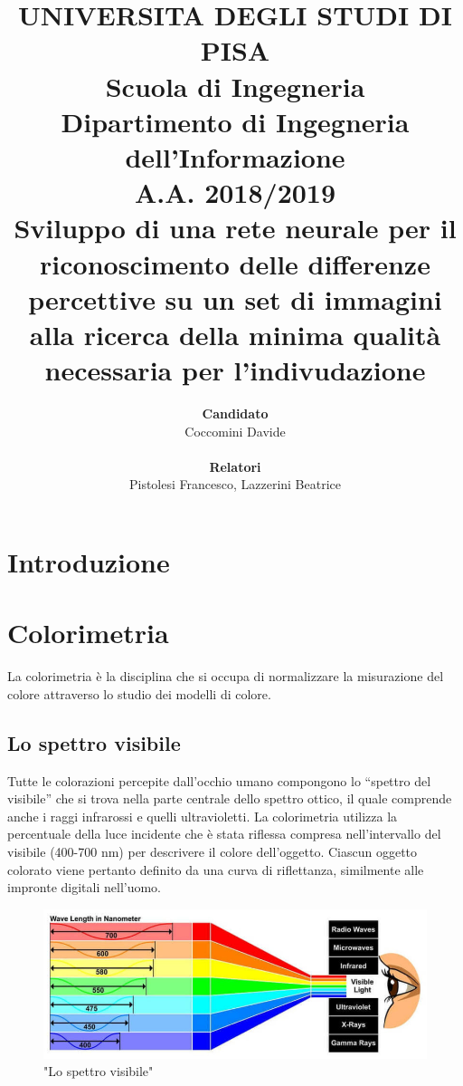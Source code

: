 \documentclass[a4paper,11pt]{article}
\author{
        \textbf{Candidato} \\
        Coccomini Davide \\\\
        \textbf{Relatori}\\
        Pistolesi Francesco, Lazzerini Beatrice \\
    }
\title{\textbf{UNIVERSITA DEGLI STUDI DI PISA} \\[0.4in]
    Scuola di Ingegneria \\
    Dipartimento di Ingegneria dell’Informazione \\
    A.A. 2018/2019\\[0.7in]
    Sviluppo di una rete neurale per il riconoscimento delle differenze percettive su un set di immagini alla ricerca della minima qualità necessaria per l'indivudazione\\[0.5in]}
\date{}
\begin{document}
    \pagestyle{fancy}
    \fancyhead{} 
    \renewcommand{\headrulewidth}{0pt}
    \fancyfoot{}
    \fancyfoot[LE,RO]{\thepage}    
    \renewcommand{\footrulewidth}{0.4pt}
    \maketitle
    \newpage
        \tableofcontents
        \newpage
        \section{Introduzione}
        \lipsum[1-3]
        \newpage
        \section{Colorimetria}
        La colorimetria è la disciplina che si occupa di normalizzare la misurazione del colore attraverso lo studio dei modelli di colore.
        \subsection{Lo spettro visibile}
        Tutte le colorazioni percepite dall’occhio umano compongono lo “spettro del visibile” che si trova nella parte centrale dello spettro ottico, il quale
        comprende anche i raggi infrarossi e quelli ultravioletti. 
        La colorimetria utilizza la percentuale della luce incidente che è stata riflessa compresa
        nell'intervallo del visibile (400-700 nm) per descrivere il colore dell'oggetto. Ciascun oggetto
        colorato viene pertanto definito da una curva di riflettanza, similmente alle impronte digitali
        nell’uomo. 
        \begin{figure}[h]
            \centering
            \includegraphics[scale=0.45]{colorimetria3}
            \caption{"Lo spettro visibile"}
        \end{figure}
        \newpage
\end{document}
